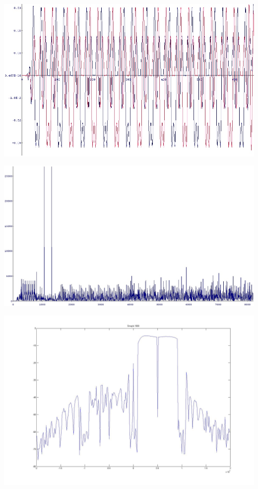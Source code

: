\begin{center}
\includegraphics[width=\textwidth]{content/fig/sts_chipscope.JPG}
\label{sts_chipscope}
\end{center}

\begin{center}
\includegraphics[width=\textwidth]{content/fig/crosscorr.JPG}
\label{crosscorr}
\end{center}


\begin{center}
\includegraphics[width=\textwidth]{content/fig/baseIFAdcDac.JPG}
\label{baseIFAdcDac}
\end{center}

